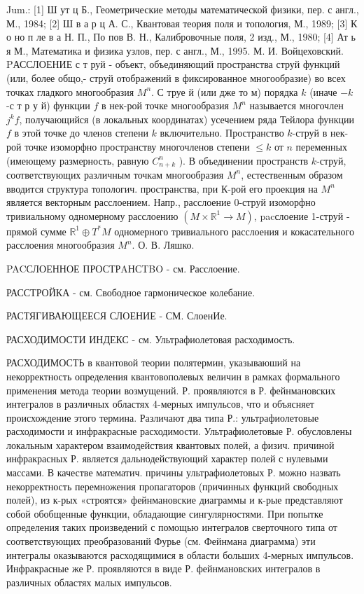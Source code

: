 \documentclass[10pt]{article}
\begin{document}
Jum.: [1] Ш ут ц Б., Геометрические методы математической физики, пер. с англ., М., 1984; [2] Ш в а р ц А. С., Квантовая теория поля и топология, М., 1989; [3] К о но п ле в а Н. П., По пов В. Н., Калибровочные поля, 2 изд., М., 1980; [4] Ат ь я М., Математика и физика узлов, пер. с англ., М., 1995. М. И. Войцеховский. PАССЛОЕНИЕ с т руй - объект, объединяющий пространства струй функций (или, более общо,- струй отображений в фиксированное многообразие) во всех точках гладкого многообразия $M^{n}$. С труе й (или дже то м) порядка $k$ (иначе $-k$-с т р у й) функции $f$ в нек-рой точке многообразия $M^{n}$ называется многочлен $j^{k} f$, получающийся (в локальных координатах) усечением ряда Тейлора функции $f$ в этой точке до членов степени $k$ включительно. Пространство $k$-струй в нек-рой точке изоморфно пространству многочленов степени $\leqslant k$ от $n$ переменных (имеющему размерность, равную $C_{n+k}^{n}$ ). В объединении пространств $k$-струй, соответствующих различным точкам многообразия $M^{n}$, естественным образом вводится структура топологич. пространства, при К-рой его проекция на $M^{n}$ является векторным расслоением. Напр., расслоение 0-струй изоморфно тривиальному одномерному расслоению $\left(M \times \mathbb{R}^{1} \rightarrow M\right)$, pacслоение 1-струй - прямой сумме $\mathbb{R}^{1} \oplus T^{*} M$ одномерного тривиального расслоения и кокасательного расслоения многообразия $M^{n}$. О. В. Ляшко.



PACСЛОЕННОЕ ПРОСТРAНСTBO - см. Расслоение.



РАССТРОЙКА - см. Свободное гармоническое колебание.



РАСТЯГИВАЮЩЕЕСЯ СЛОЕНИЕ - СМ. СлоенИе.



РАСХОДИМОСТИ ИНДЕКС - см. Ультрафиолетовая расходимость.



РАСХОДИМОСТЬ в квантовой теории полятермин, указываюший на некорректность определения квантовополевых величин в рамках формального применения метода теории возмущений. Р. проявляются в Р. фейнмановских интегралов в различных областях 4-мерных импульсов, что и объясняет происхождение этого термина. Различают два типа Р.: ультрафиолетовые расходимости и инфракрасные расходимости. Ультрафиолетовые Р. обусловлены локальным характером взаимодействия квантовых полей, а физич. причиной инфракрасных Р. является дальнодействующий характер полей с нулевыми массами. В качестве математич. причины ультрафиолетовых Р. можно назвать некорректность перемножения пропагаторов (причинных функций свободных полей), из к-рых «строятся» фейнмановские диаграммы и к-рые представляют собой обобщенные функции, обладающие сингулярностями. При попытке определения таких произведений с помощью интегралов сверточного типа от соответствующих преобразований Фурье (см. Фейнмана диаграмма) эти интегралы оказываются расходящимися в области больших 4-мерных импульсов. Инфракрасные же Р. проявляются в виде Р. фейнмановских интегралов в различных областях малых импульсов.
\end{document}
